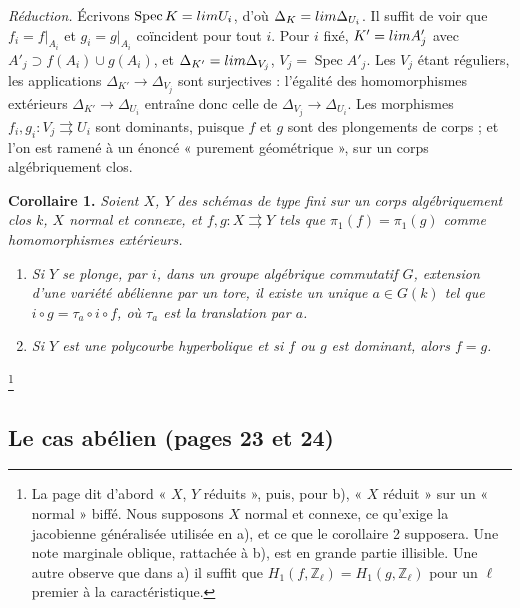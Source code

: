 \documentclass[11pt,a4paper]{article}
\begin{document}
\emph{Réduction.} Écrivons $\operatorname{Spec} K = \varprojlim U_i$, d'où
$\Delta_K = \varprojlim \Delta_{U_i}$. Il suffit de voir que $f_i = f|_{A_i}$
et $g_i = g|_{A_i}$ coïncident pour tout $i$. Pour $i$ fixé, $K' =
\varinjlim A'_j$ avec $A'_j \supset f(A_i) \cup g(A_i)$, et $\Delta_{K'} =
\varprojlim \Delta_{V_j}$, $V_j = \operatorname{Spec} A'_j$. Les $V_j$ étant
réguliers, les applications $\Delta_{K'} \to \Delta_{V_j}$ sont surjectives :
l'égalité des homomorphismes extérieurs $\Delta_{K'} \to \Delta_{U_i}$
entraîne donc celle de $\Delta_{V_j} \to \Delta_{U_i}$. Les morphismes $f_i,
g_i : V_j \rightrightarrows U_i$ sont dominants, puisque $f$ et $g$ sont des
plongements de corps ; et l'on est ramené à un énoncé « purement
géométrique », sur un corps algébriquement clos.

\textbf{Corollaire 1.} \emph{Soient $X$, $Y$ des schémas de type fini sur un
corps algébriquement clos $k$, $X$ normal et connexe, et $f, g : X
\rightrightarrows Y$ tels que $\pi_1(f) = \pi_1(g)$ comme homomorphismes
extérieurs.}
\begin{enumerate}
\item[a)] \emph{Si $Y$ se plonge, par $i$, dans un groupe algébrique
commutatif $G$, extension d'une variété abélienne par un tore, il existe un
unique $a \in G(k)$ tel que $i \circ g = \tau_a \circ i \circ f$, où $\tau_a$
est la translation par $a$.}
\item[b)] \emph{Si $Y$ est une polycourbe hyperbolique et si $f$ ou $g$ est
dominant, alors $f = g$.}
\end{enumerate}
\footnote{La page dit d'abord « $X$, $Y$ réduits », puis, pour b), « $X$
réduit » sur un « normal » biffé. Nous supposons $X$ normal et connexe, ce
qu'exige la jacobienne généralisée utilisée en a), et ce que le corollaire 2
supposera. Une note marginale oblique, rattachée à b), est en grande partie
illisible. Une autre observe que dans a) il suffit que $H_1(f, \mathbb{Z}_\ell)
= H_1(g, \mathbb{Z}_\ell)$ pour un $\ell$ premier à la caractéristique.}

\subsection*{Le cas abélien (pages 23 et 24)}
\end{document}
